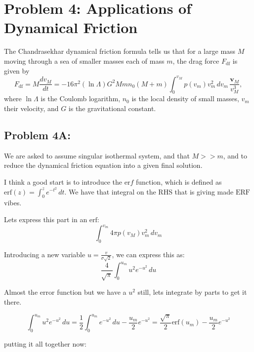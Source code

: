 \section*{Problem 4: Applications of Dynamical Friction}

The Chandrasekhar dynamical friction formula tells us that for a large mass $M$ moving through a sea of smaller
masses each of mass $m$, the drag force $F_{\mathrm{df}}$ is given by
\begin{equation} \label{eq:dynamical_friction}
    F_{\mathrm{df}} = M \frac{dv_M}{dt} 
    = -16 \pi^2 (\ln \Lambda) G^2 M m n_0 (M+m) 
    \int_0^{v_M} p(v_m) v_m^2 \, dv_m \, \frac{\mathbf{v}_M}{v_M^3},
\end{equation}
where $\ln \Lambda$ is the Coulomb logarithm, $n_0$ is the local density of small masses, $v_m$ their velocity, 
and $G$ is the gravitational constant.

\subsection*{Problem 4A:}

We are asked to assume singular isothermal system, and that $M>>m$, and to reduce the dynamical friction equation into a given final solution. 

I think a good start is to introduce the $\mathrm{er}f$ function, which is defined as $\mathrm{erf}(z) = \int_{0}^{z} e^{-t^2}\,dt$. We have that integral on the RHS that is giving made $\mathrm{ERF}$ vibes. 

Lets express this part in an $\mathrm{erf}$:
\begin{equation}
    \int_{0}^{v_m}  4 \pi p(v_M)v_m^2 \,dv_m
\end{equation}

Introducing a new variable $u = \frac{v}{\sigma \sqrt{2}}$, we can express this as:
\begin{equation}
    \frac{4}{\sqrt{\pi}} \int_{0}^{u_m} u^2e^{-u^2}\,du
\end{equation}

Almost the error function but we have a $u^2$ still, lets integrate by parts to get it there. 

\begin{equation}
    \int_{0}^{u_m} u^2e^{-u^2}\,du = \frac{1}{2}\int_{0}^{u_m} e^{-u^2}\,du - \frac{u_m}{2}e^{-u^2} = \frac{\sqrt{\pi}}{2} \mathrm{erf}(u_m) - \frac{u_m}{2}e^{-u^2} 
\end{equation}

putting it all together now:


